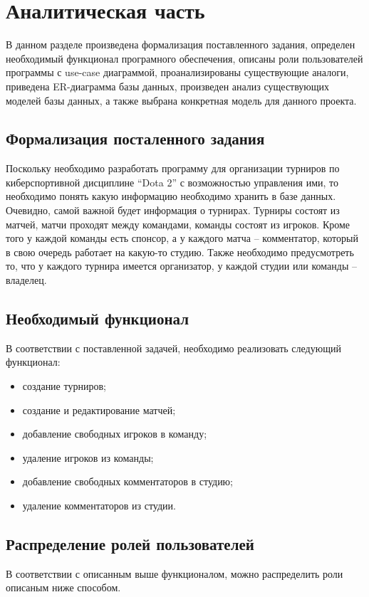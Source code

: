 \chapter{Аналитическая часть}
\label{cha:analysis}

В данном разделе произведена формализация поставленного задания, определен необходимый функционал програмного обеспечения, описаны роли пользователей программы с use-case диаграммой, проанализированы существующие аналоги, приведена ER-диаграмма базы данных, произведен анализ существующих моделей базы данных, а также выбрана конкретная модель для данного проекта.

\section{Формализация посталенного задания}
Поскольку необходимо разработать программу для организации турниров по киберспортивной дисциплине “Dota 2” с возможностью управления ими, то необходимо понять какую информацию необходимо хранить в базе данных. Очевидно, самой важной будет информация о турнирах. Турниры состоят из матчей, матчи проходят между командами, команды состоят из игроков. Кроме того у каждой команды есть спонсор, а у каждого матча -- комментатор, который в свою очередь работает на какую-то студию. Также необходимо предусмотреть то, что у каждого турнира имеется организатор, у каждой студии или команды -- владелец.

\section{Необходимый функционал}
В соответствии с поставленной задачей, необходимо реализовать следующий функционал:
\begin{itemize}
	\item создание турниров;
	\item создание и редактирование матчей;
	\item добавление свободных игроков в команду;
	\item удаление игроков из команды;
	\item добавление свободных комментаторов в студию;
	\item удаление комментаторов из студии.
\end{itemize}

\section{Распределение ролей пользователей}
В соответствии с описанным выше функционалом, можно распределить роли описаным ниже способом.

